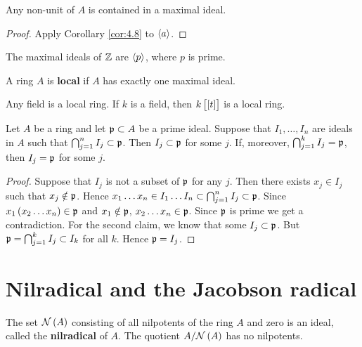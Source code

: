\begin{corollary}
\label{cor:4.9}
Any non-unit of $ A $ is contained in a maximal ideal.
\end{corollary}

\begin{proof}
Apply Corollary \ref{cor:4.8} to $ \left\langle a \right\rangle $.
\end{proof}

\begin{example*}
The maximal ideals of $ \mathbb{Z} $ are $ \left\langle p \right\rangle $, where $ p $ is prime.
\end{example*}

\begin{definition}
A ring $ A $ is \textbf{local} if $ A $ has exactly one maximal ideal.
\end{definition}

\begin{example*}
Any field is a local ring. If $ k $ is a field, then $ k\sbr{\sbr{t}} $ is a local ring.
\end{example*}

\begin{lemma}
\label{lem:4.12}
Let $ A $ be a ring and let $ \mathfrak{p} \subset A $ be a prime ideal. Suppose that $ I_1, \dots, I_n $ are ideals in $ A $ such that $ \bigcap_{j = 1}^n I_j \subset \mathfrak{p} $. Then $ I_j \subset \mathfrak{p} $ for some $ j $. If, moreover, $ \bigcap_{j = 1}^k I_j = \mathfrak{p} $, then $ I_j = \mathfrak{p} $ for some $ j $.
\end{lemma}

\begin{proof}
Suppose that $ I_j $ is not a subset of $ \mathfrak{p} $ for any $ j $. Then there exists $ x_j \in I_j $ such that $ x_j \notin \mathfrak{p} $. Hence $ x_1 \dots x_n \in I_1 \dots I_n \subset \bigcap_{j = 1}^n I_j \subset \mathfrak{p} $. Since $ x_1\br{x_2 \dots x_n} \in \ppp $ and $ x_1 \notin \mathfrak{p} $, $ x_2 \dots x_n \in \mathfrak{p} $. Since $ \mathfrak{p} $ is prime we get a contradiction. For the second claim, we know that some $ I_j \subset \mathfrak{p} $. But $ \mathfrak{p} = \bigcap_{j = 1}^k I_j \subset I_k $ for all $ k $. Hence $ \mathfrak{p} = I_j $.
\end{proof}

\section{Nilradical and the Jacobson radical}


\begin{proposition}
The set $ \NNN\br{A} $ consisting of all nilpotents of the ring $ A $ and zero is an ideal, called the \textbf{nilradical} of $ A $. The quotient $ A / \NNN\br{A} $ has no nilpotents.
\end{proposition}

